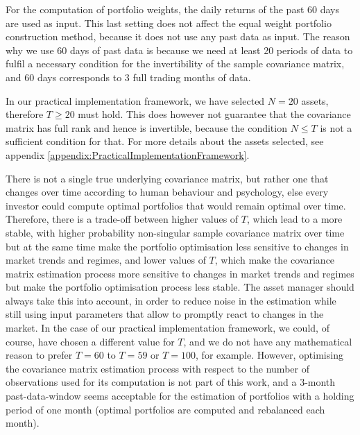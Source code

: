         For the computation of portfolio weights, the daily returns of the past 60 days are used as input. This last setting does not affect the equal weight portfolio construction method, because it does not use any past data as input. The reason why we use 60 days of past data is because we need at least 20 periods of data to fulfil a necessary condition for the invertibility of the sample covariance matrix, and 60 days corresponds to 3 full trading months of data.
        
        In our practical implementation framework, we have selected $N = 20$ assets, therefore $T \geq 20$ must hold. This does however not guarantee that the covariance matrix has full rank and hence is invertible, because the condition $N \leq T$ is not a sufficient condition for that. For more details about the assets selected, see appendix \ref{appendix:PracticalImplementationFramework}.
    	
    	There is not a single true underlying covariance matrix, but rather one that changes over time according to human behaviour and psychology, else every investor could compute optimal portfolios that would remain optimal over time. Therefore, there is a trade-off between higher values of $T$, which lead to a more stable, with higher probability non-singular sample covariance matrix over time but at the same time make the portfolio optimisation less sensitive to changes in market trends and regimes, and lower values of $T$, which make the covariance matrix estimation process more sensitive to changes in market trends and regimes but make the portfolio optimisation process less stable. The asset manager should always take this into account, in order to reduce noise in the estimation while still using input parameters that allow to promptly react to changes in the market. In the case of our practical implementation framework, we could, of course, have chosen a different value for $T$, and we do not have any mathematical reason to prefer $T=60$ to $T=59$ or $T=100$, for example. However, optimising the covariance matrix estimation process with respect to the number of observations used for its computation is not part of this work, and a 3-month past-data-window seems acceptable for the estimation of portfolios with a holding period of one month (optimal portfolios are computed and rebalanced each month).
        
        
